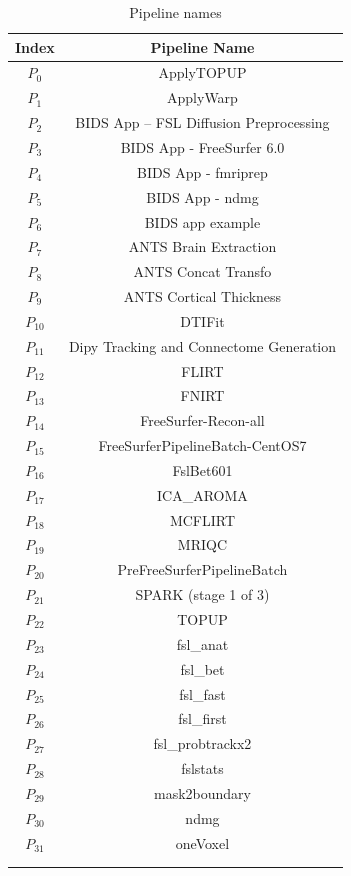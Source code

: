\documentclass[conference]{IEEEtran}
\begin{document}




\begin{table}
    \centering
    \begin{tabular}{cc}
        \hline
        Index & Pipeline Name  \\
        \hline 
        $P_{0}$ & ApplyTOPUP \\
        $P_{1}$ & ApplyWarp\\
        $P_{2}$ & BIDS App -- FSL Diffusion Preprocessing\\
        $P_{3}$ & BIDS App - FreeSurfer 6.0\\
        $P_{4}$ & BIDS App - fmriprep\\
        $P_{5}$ & BIDS App - ndmg\\
        $P_{6}$ & BIDS app example\\
        $P_{7}$ & ANTS Brain Extraction\\
        $P_{8}$ & ANTS Concat Transfo\\
        $P_{9}$ & ANTS Cortical Thickness\\
        $P_{10}$ & DTIFit\\
        $P_{11}$ & Dipy Tracking and Connectome Generation\\
        $P_{12}$ & FLIRT	\\
        $P_{13}$ & FNIRT	\\
        $P_{14}$ & FreeSurfer-Recon-all\\
        $P_{15}$ & FreeSurferPipelineBatch-CentOS7\\
        $P_{16}$ & FslBet601	\\
        $P_{17}$ & ICA\_AROMA	\\
        $P_{18}$ & MCFLIRT	\\
        $P_{19}$ &MRIQC	\\
        $P_{20}$ & PreFreeSurferPipelineBatch	\\
        $P_{21}$ & SPARK (stage 1 of 3)	\\
        $P_{22}$ & TOPUP	\\
        $P_{23}$ & fsl\_anat	\\
        $P_{24}$ & fsl\_bet	\\
        $P_{25}$ & fsl\_fast	\\
        $P_{26}$ & fsl\_first	\\
        $P_{27}$ & fsl\_probtrackx2	\\
        $P_{28}$ & fslstats	\\
        $P_{29}$ &mask2boundary\\
        $P_{30}$ & ndmg	\\
        $P_{31}$ & oneVoxel\\
        \hline\\
        &
    \end{tabular}
    \caption{Pipeline names}
    \label{tab:pipeline_names}
\end{table}
\end{document}
